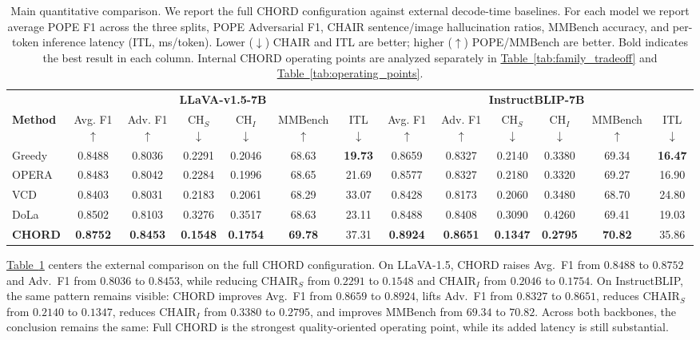 \documentclass[sigconf,anonymous]{acmart}
\newcommand{\Tref}[1]{\hyperref[#1]{Table~\ref*{#1}}}
\begin{document}
\begin{table}[t]
\centering
\scriptsize
\setlength{\tabcolsep}{4pt}
\caption{Main quantitative comparison. We report the full CHORD configuration against external decode-time baselines. For each model we report average POPE F1 across the three splits, POPE Adversarial F1, CHAIR sentence/image hallucination ratios, MMBench accuracy, and per-token inference latency (ITL, ms/token). Lower ($\downarrow$) CHAIR and ITL are better; higher ($\uparrow$) POPE/MMBench are better. Bold indicates the best result in each column. Internal CHORD operating points are analyzed separately in \Tref{tab:family_tradeoff} and \Tref{tab:operating_points}.}
\label{tab:main_results}
\begin{tabular}{l|cccccc|cccccc}
\toprule
\multicolumn{1}{c|}{} & \multicolumn{6}{c|}{\textbf{LLaVA-v1.5-7B}} & \multicolumn{6}{c}{\textbf{InstructBLIP-7B}} \\
\cmidrule(lr){2-7} \cmidrule(lr){8-13}
\textbf{Method} & Avg. F1 $\uparrow$ & Adv. F1 $\uparrow$ & CH$_S$ $\downarrow$ & CH$_I$ $\downarrow$ & MMBench $\uparrow$ & ITL $\downarrow$ & Avg. F1 $\uparrow$ & Adv. F1 $\uparrow$ & CH$_S$ $\downarrow$ & CH$_I$ $\downarrow$ & MMBench $\uparrow$ & ITL $\downarrow$ \\
\midrule
Greedy          
& 0.8488 & 0.8036 & 0.2291 & 0.2046 & 68.63 & \textbf{19.73} 
& 0.8659 & 0.8327 & 0.2140 & 0.3380 & 69.34 & \textbf{16.47} \\
OPERA~\cite{huang2024opera_cvpr} 
& 0.8483 & 0.8042 & 0.2284 & 0.1996 & 68.65 & 21.69 
& 0.8577 & 0.8327 & 0.2180 & 0.3320 & 69.27 & 16.90 \\
VCD~\cite{leng2023mitigating}   
& 0.8403 & 0.8031 & 0.2183 & 0.2061 & 68.29 & 33.07 
& 0.8428 & 0.8173 & 0.2060 & 0.3480 & 68.70 & 24.80 \\
DoLa~\cite{chuang2023dola}      
& 0.8502 & 0.8103 & 0.3276 & 0.3517 & 68.63 & 23.11 
& 0.8488 & 0.8408 & 0.3090 & 0.4260 & 69.41 & 19.03 \\
\textbf{CHORD}                  
& \textbf{0.8752} & \textbf{0.8453} & \textbf{0.1548} & \textbf{0.1754} & \textbf{69.78} & 37.31 
& \textbf{0.8924} & \textbf{0.8651} & \textbf{0.1347} & \textbf{0.2795} & \textbf{70.82} & 35.86 \\
\bottomrule
\end{tabular}
\end{table}

\Tref{tab:main_results} centers the external comparison on the full CHORD configuration. On LLaVA-1.5, CHORD raises Avg.\ F1 from $0.8488$ to $0.8752$ and Adv.\ F1 from $0.8036$ to $0.8453$, while reducing $\text{CHAIR}_S$ from $0.2291$ to $0.1548$ and $\text{CHAIR}_I$ from $0.2046$ to $0.1754$. On InstructBLIP, the same pattern remains visible: CHORD improves Avg.\ F1 from $0.8659$ to $0.8924$, lifts Adv.\ F1 from $0.8327$ to $0.8651$, reduces $\text{CHAIR}_S$ from $0.2140$ to $0.1347$, reduces $\text{CHAIR}_I$ from $0.3380$ to $0.2795$, and improves MMBench from $69.34$ to $70.82$. Across both backbones, the conclusion remains the same: Full CHORD is the strongest quality-oriented operating point, while its added latency is still substantial.
\end{document}
